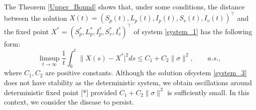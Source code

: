 \begin{remark}
 	The Theorem \ref{Upper_Bound} shows that, under some conditions, the 
 	distance between the solution 
 	$
 		X(t)=(S_p(t),L_p(t),I_p(t),S_v(t),I_v(t))^\top
 	$ and the fixed point 
 	$
 		X^*=(S_p^*,L_p^*,I_p^*,S_v^*,I_v^*)^\top
 	$ of system \eqref{system_1} has the following form:
 	\begin{equation*}
  		\limsup_{t\to\infty}
  		\frac{1}{t}
  		\int_{0} ^ {t}
  			\|X(s) - X ^*| ^ 2 
  		ds
  		\leq 
  		C_1 + C_2
  		\|\sigma\| ^ 2,
  		\qquad a.s.,
 	\end{equation*}
 	where $C_1, C_2$ are positive constants. Although the solution ofsystem 
 	\eqref{system_3} does not have stability as the deterministic system, we 
 	obtain oscillations around deterministic fixed point
 	[*] provided 
 	$
 		C_1 + C_2 
 		\|\sigma\|^2
 	$ is sufficiently small. In this context, we 
 	consider the disease to persist.
\end{remark}
